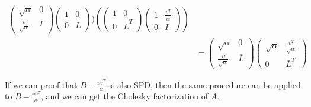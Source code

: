 \begin{theorem}
\begin{align*}
\begin{pmatrix}
            \sqrt{\alpha} & 0 \\
            \frac{v}{\sqrt{\alpha}} & I
        \end{pmatrix} \begin{pmatrix}
            1 & 0 \\
            0 & \bar{L}
        \end{pmatrix}) (\begin{pmatrix}
            1 & 0 \\
            0 & \bar{L}^T
        \end{pmatrix} \begin{pmatrix}
            1 & \frac{v^T}{\alpha} \\
            0 & I
        \end{pmatrix} ) \\[3pt]
        &= \begin{pmatrix}
            \sqrt{\alpha} & 0 \\
            \frac{v}{\sqrt{\alpha}} & \bar{L}
        \end{pmatrix} \begin{pmatrix}
            \sqrt{\alpha} & \frac{v^T}{\sqrt{\alpha}} \\
            0 & \bar{L}^T
        \end{pmatrix}
    \end{align*}
\end{theorem}

\begin{note}
    If we can proof that $B - \frac{vv^T}{\alpha}$ is also SPD, then the same procedure can be applied to $B - \frac{vv^T}{\alpha}$, and we can get the Cholesky factorization of $A$.
\end{note}

